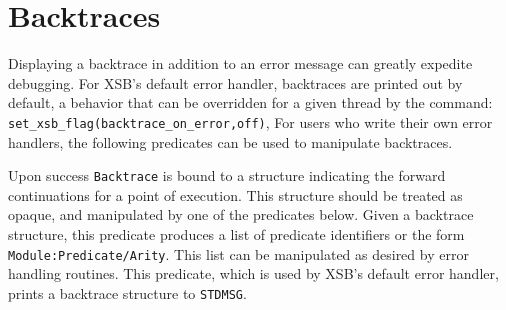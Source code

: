 \section{Backtraces}
\label{sec:backtrace}

Displaying a backtrace in addition to an error message can greatly
expedite debugging.  For XSB's default error handler, backtraces are
printed out by default, a behavior that can be overridden for a given
thread by the command: {\tt set\_xsb\_flag(backtrace\_on\_error,off)},
For users who write their own error handlers, the following predicates
can be used to manipulate backtraces.

\begin{description}
Upon success {\tt Backtrace} is bound to a structure indicating the
forward continuations for a point of execution.  This structure should
be treated as opaque, and manipulated by one of the predicates below.
%
Given a backtrace structure, this predicate produces a list of
predicate identifiers or the form {\tt Module:Predicate/Arity}.  This
list can be manipulated as desired by error handling routines.
%
 This predicate, which is used by XSB's default error handler, prints
 a backtrace structure to {\tt STDMSG}.
\end{description}
